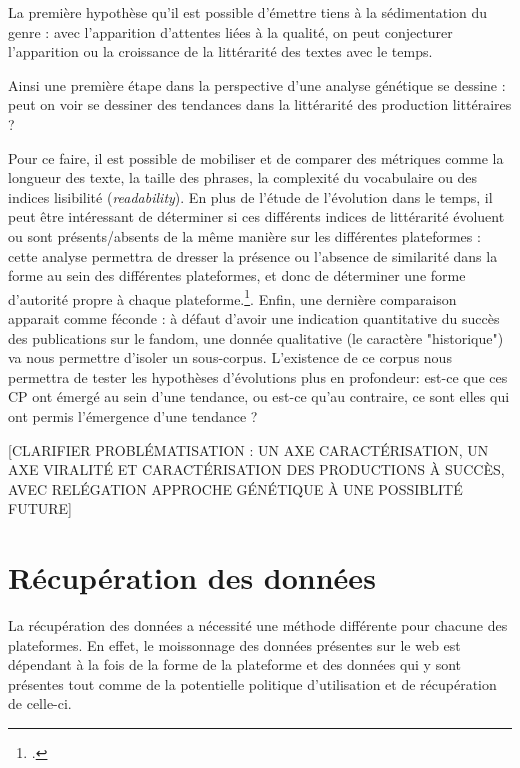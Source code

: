 \documentclass[12pt,a4paper,oneside,titlepage]{book} %
\begin{document}
	La première hypothèse qu'il est possible d'émettre tiens à la sédimentation du genre : avec l'apparition d'attentes liées à la qualité, on peut conjecturer l'apparition ou la croissance de la littérarité des textes avec le temps.
	

	Ainsi une première étape dans la perspective d'une analyse génétique se dessine : peut on voir se dessiner des tendances dans la littérarité des production littéraires ? 

	Pour ce faire, il est possible de mobiliser et de comparer des métriques comme la longueur des texte, la taille des phrases, la complexité du vocabulaire ou des indices lisibilité (\textit{readability}). 
	En plus de l'étude de l'évolution dans le temps, il peut être intéressant de déterminer si ces différents indices de littérarité évoluent ou sont présents/absents de la même manière sur les différentes plateformes : cette analyse permettra de dresser la présence ou l'absence de similarité dans la forme au sein des différentes plateformes, et donc de déterminer une forme d'autorité propre à chaque plateforme.\footcite{mayer_autorite_2017}. 
	Enfin, une dernière comparaison apparait comme féconde : à défaut d'avoir une indication quantitative du succès des publications sur le fandom, une donnée qualitative (le caractère "historique") va nous permettre d'isoler un sous-corpus.  L'existence de ce corpus nous permettra de tester les hypothèses d'évolutions plus en profondeur: est-ce que ces CP ont émergé au sein d'une tendance, ou est-ce qu'au contraire, ce sont elles qui ont permis l'émergence d'une tendance ? 
	
	[CLARIFIER PROBLÉMATISATION : UN AXE CARACTÉRISATION, UN AXE VIRALITÉ ET CARACTÉRISATION DES PRODUCTIONS À SUCCÈS, AVEC RELÉGATION APPROCHE GÉNÉTIQUE À UNE POSSIBLITÉ FUTURE]
		\part{Récupération des données}
	
	La récupération des données a nécessité une méthode différente pour chacune des plateformes.  En effet, le moissonnage des données présentes sur le web est dépendant à la fois de la forme de la plateforme et des données qui y sont présentes tout comme de la potentielle politique d'utilisation et de récupération de celle-ci. 
	
\end{document}
